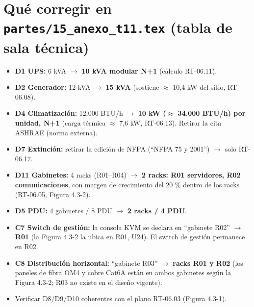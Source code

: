\documentclass[carta,firma]{lafrox}
\begin{document}
\section*{Qué corregir en \texttt{partes/15\_anexo\_t11.tex} (tabla de sala técnica)}

\begin{itemize}
  \item \textbf{D1 UPS:} 6 kVA $\rightarrow$ \textbf{10 kVA modular N+1} (cálculo RT-06.11).
  \item \textbf{D2 Generador:} 12 kVA $\rightarrow$ \textbf{15 kVA} (sostiene $\approx$ 10,4 kW del sitio, RT-06.08).
  \item \textbf{D4 Climatización:} 12.000 BTU/h $\rightarrow$ \textbf{10 kW ($\approx$ 34.000 BTU/h) por unidad, N+1} (carga térmica $\approx$ 7,6 kW, RT-06.13). Retirar la cita ASHRAE (norma externa).
  \item \textbf{D7 Extinción:} retirar la edición de NFPA (``NFPA 75 y 2001'') $\rightarrow$ solo RT-06.17.
  \item \textbf{D11 Gabinetes:} 4 racks (R01--R04) $\rightarrow$ \textbf{2 racks: R01 servidores, R02 comunicaciones}, con margen de crecimiento del 20 \% dentro de los racks (RT-06.05, Figura 4.3-2).
  \item \textbf{D5 PDU:} 4 gabinetes / 8 PDU $\rightarrow$ \textbf{2 racks / 4 PDU}.
  \item \textbf{C7 Switch de gestión:} la consola KVM se declara en ``gabinete R02'' $\rightarrow$ \textbf{R01} (la Figura 4.3-2 la ubica en R01, U24). El switch de gestión permanece en R02.
  \item \textbf{C8 Distribución horizontal:} ``gabinete R03'' $\rightarrow$ \textbf{racks R01 y R02} (los paneles de fibra OM4 y cobre Cat6A están en ambos gabinetes según la Figura 4.3-2; R03 no existe en el diseño vigente).
  \item Verificar D8/D9/D10 coherentes con el plano RT-06.03 (Figura 4.3-1).
\end{itemize}
\end{document}
